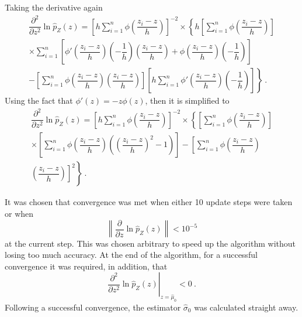 Taking the derivative again
\begin{multline}
	\dfrac{
		\partial^2
	}
	{
		\partial z^2
	}
	\ln\widehat{p}_Z(z)
	=
	\left[
		h\sum_{i=1}^n
		\phi\left(
			\dfrac{
				z_i-z
			}
			{
				h
			}
		\right)
	\right]^{-2}
	\times
	\left\{
		h\left[
			\sum_{i=1}^n
			\phi\left(
				\dfrac{
					z_i-z
				}
				{
					h
				}
			\right)
		\right]
	\right.
	\\
	\left.
		\times
		\sum_{i=1}^n\left[
			\phi'\left(
				\dfrac{
					z_i-z
				}
				{
					h
				}
			\right)
			\left(
				-\dfrac{
					1
				}
				{
					h
				}
			\right)
			\left(
				\dfrac{
					z_i-z
				}
				{
					h
				}
			\right)
			+\phi\left(
				\dfrac{
					z_i-z
				}
				{
					h
				}
			\right)
			\left(
				-\dfrac{
					1
				}
				{
					h
				}
			\right)
		\right]
	\right.
	\\
	\left.
		-
		\left[
			\sum_{i=1}^n
			\phi\left(
				\dfrac{
					z_i-z
				}
				{
					h
				}
			\right)
			\left(
				\dfrac{
					z_i-z
				}
				{
					h
				}
			\right)
		\right]
		\left[
			h\sum_{i=1}^n
			\phi'\left(
				\dfrac{
					z_i-z
				}
				{
					h
				}
			\right)
			\left(
				-\dfrac{
					1
				}
				{
					h
				}
			\right)
		\right]
	\right\}
	\ .
\end{multline}
Using the fact that $\phi'(z)=-z\phi(z)$, then it is simplified to
\begin{multline}
	\dfrac{
		\partial^2
	}
	{
		\partial z^2
	}
	\ln\widehat{p}_Z(z)
	=
	\left[
		h\sum_{i=1}^n
		\phi\left(
			\dfrac{
				z_i-z
			}
			{
				h
			}
		\right)
	\right]^{-2}
	\times
	\left\{
		\left[
			\sum_{i=1}^n
			\phi\left(
				\dfrac{
					z_i-z
				}
				{
					h
				}
			\right)
		\right]
	\right.
	\\
	\left.
		\times
		\left[
			\sum_{i=1}^n
			\phi\left(
				\dfrac{
					z_i-z
				}
				{
					h
				}
			\right)
			\left(
				\left(
					\dfrac{
						z_i-z
					}
					{
						h
					}
				\right)^2
				-1
			\right)
		\right]
		-
		\left[
			\sum_{i=1}^n
			\phi\left(
				\dfrac{
					z_i-z
				}
				{
					h
				}
			\right)
		\right.
	\right.
	\\
	\left.
		\left.
			\left(
				\dfrac{
					z_i-z
				}
				{
					h
				}
			\right)
		\right]^2
	\right\}
	\ .
\end{multline}

It was chosen that convergence was met when either 10 update steps were taken or when
\begin{equation}
	\left\|
		\dfrac{
			\partial
		}
		{
			\partial z
		}
	\ln\widehat{p}_Z(z)
	\right\|
	<10^{-5}
\end{equation}
at the current step. This was chosen arbitrary to speed up the algorithm without losing too much accuracy. At the end of the algorithm, for a successful convergence it was required, in addition, that
\begin{equation}
	\left.
		\dfrac{
			\partial^2
		}
		{
			\partial z^2
		}
		\ln\widehat{p}_Z(z)
	\right|_{z=\widehat{\mu}_0}
	< 0 \ .
\end{equation}
Following a successful convergence, the estimator $\widehat{\sigma}_0$ was calculated straight away.

